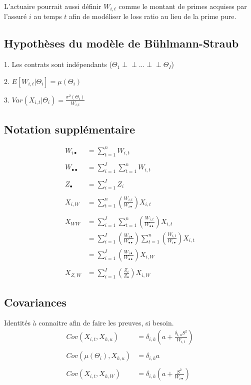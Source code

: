 \documentclass[11pt,french]{report}
\begin{document}
L'actuaire pourrait aussi définir $W_{i,t}$ comme le montant de primes acquises par l'assuré $i$ au temps $t$ afin de modéliser le loss ratio au lieu de la prime pure.

\subsection{Hypothèses du modèle de Bühlmann-Straub}

1. Les contrats sont indépendants ($\Theta_1 {\perp\!\!\!\perp} ... {\perp\!\!\!\perp} \Theta_I$)

2. $E[W_{i,t}|\Theta_i] = \mu(\Theta_i)$

3. $Var(X_{i,t}|\Theta_i) = \frac{\sigma^2(\Theta_i)}{W_{i,t}}$

\subsection{ Notation supplémentaire}
$$\boxed{\begin{aligned}
W_{i\bullet} &= \sum_{t=1}^n W_{i,t} \\ \\
W_{\bullet \bullet} &= \sum_{i=1}^I \sum_{t=1}^{n} W_{i,t} \\ \\ 
Z_{\bullet} &= \sum_{i=1}^I Z_i \\ \\
X_{i,W} &= \sum_{t=1}^n \left(\frac{W_{i,t}}{W_{i \bullet}} \right) X_{i,t} \\ \\
X_{WW} &= \sum_{i=1}^I \sum_{t=1}^n \left(\frac{W_{i,t}}{W_{\bullet \bullet}} \right) X_{i,t} \\
&= \sum_{i=1}^I \left(\frac{W_{i \bullet}}{W_{\bullet \bullet}} \right) \sum_{t=1}^n \left(\frac{W_{i,t}}{W_{i \bullet}} \right)X_{i,t} \\
&= \sum_{i=1}^I \left(\frac{W_{i \bullet}}{W_{\bullet \bullet}} \right) X_{i,W} \\ \\
X_{Z,W} &= \sum_{i=1}^I \left(\frac{Z_i}{Z_{\bullet}} \right) X_{i,W}
\end{aligned}}$$

\subsection{Covariances } 
Identités à connaitre afin de faire les preuves, si besoin.
$$\boxed{\begin{aligned}
Cov(X_{i,t},X_{k,u}) &= \delta_{i,k}\left(a + \frac{\delta_{t,u}S^2}{W_{i,t}} \right) \\ \\
Cov(\mu(\Theta_i),X_{k,u}) &= \delta_{i,k} a \\ \\
Cov(X_{i,t},X_{k,W}) &= \delta_{i,k}\left(a + \frac{S^2}{W_{i \bullet}} \right)
\end{aligned}}$$
\end{document}
